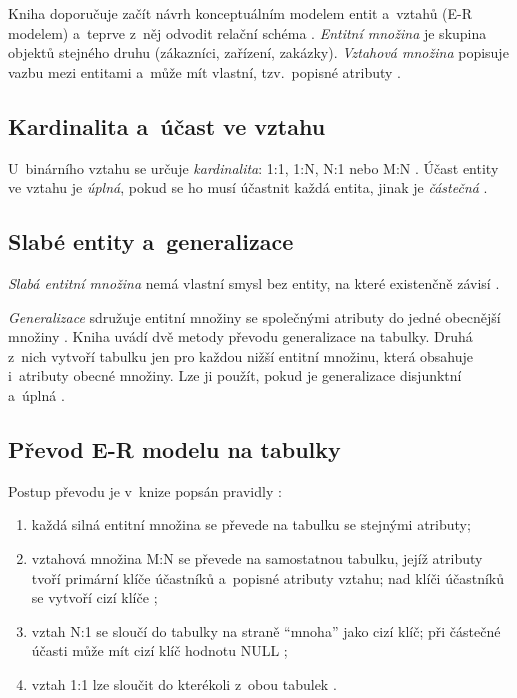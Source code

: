 Kniha doporučuje začít návrh konceptuálním modelem entit a~vztahů (E-R modelem) a~teprve z~něj odvodit relační schéma \cite[s.~241--243]{Silberschatz2020}. \emph{Entitní množina} je skupina objektů stejného druhu (zákazníci, zařízení, zakázky). \emph{Vztahová množina} popisuje vazbu mezi entitami a~může mít vlastní, tzv.~popisné atributy \cite[s.~244--248]{Silberschatz2020}.

\subsection{Kardinalita a~účast ve vztahu}

U~binárního vztahu se určuje \emph{kardinalita}: 1:1, 1:N, N:1 nebo M:N \cite[s.~252]{Silberschatz2020}. Účast entity ve vztahu je \emph{úplná}, pokud se ho musí účastnit každá entita, jinak je \emph{částečná} \cite[s.~255]{Silberschatz2020}.

\subsection{Slabé entity a~generalizace}

\emph{Slabá entitní množina} nemá vlastní smysl bez entity, na které existenčně závisí \cite[s.~259]{Silberschatz2020}.

\emph{Generalizace} sdružuje entitní množiny se společnými atributy do jedné obecnější množiny \cite[s.~271--275]{Silberschatz2020}. Kniha uvádí dvě metody převodu generalizace na tabulky. Druhá z~nich vytvoří tabulku jen pro každou nižší entitní množinu, která obsahuje i~atributy obecné množiny. Lze ji použít, pokud je generalizace disjunktní a~úplná \cite[s.~278]{Silberschatz2020}.

\subsection{Převod E-R modelu na tabulky}

Postup převodu je v~knize popsán pravidly \cite[s.~265--271]{Silberschatz2020}:
\begin{enumerate}
\item každá silná entitní množina se převede na tabulku se stejnými atributy;
\item vztahová množina M:N se převede na samostatnou tabulku, jejíž atributy tvoří primární klíče účastníků a~popisné atributy vztahu; nad klíči účastníků se vytvoří cizí klíče \cite[s.~268]{Silberschatz2020};
\item vztah N:1 se sloučí do tabulky na straně \enquote{mnoha} jako cizí klíč; při částečné účasti může mít cizí klíč hodnotu NULL \cite[s.~270--271]{Silberschatz2020};
\item vztah 1:1 lze sloučit do kterékoli z~obou tabulek \cite[s.~271]{Silberschatz2020}.
\end{enumerate}

